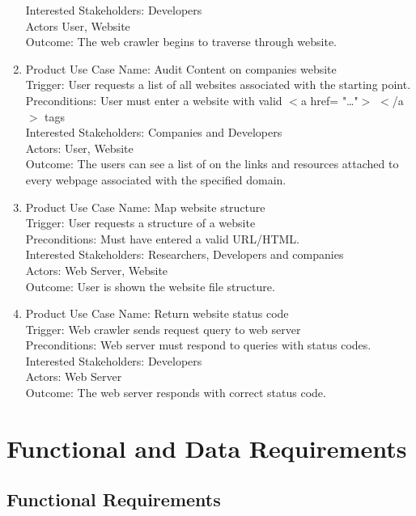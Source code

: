 \documentclass[titlepage]{article}
\begin{document}
\begin{enumerate}
Interested Stakeholders: Developers\\
Actors User, Website\\
Outcome: The web crawler begins to traverse through website.\\
  \item Product Use Case Name: Audit Content on companies website \\
Trigger: User requests a list of all websites associated with the starting point.\\
Preconditions: User must enter a website with valid $<$a href= "\ldots"$>$ $<$/a$>$ tags\\
Interested Stakeholders: Companies and Developers\\
Actors: User, Website\\
Outcome: The users can see a list of on the links and resources attached to every webpage associated with the specified domain.\\
  \item Product Use Case Name: Map website structure\\
Trigger: User requests a structure of a website\\
Preconditions: Must have entered a valid URL/HTML.\\
Interested Stakeholders: Researchers, Developers and companies\\
Actors: Web Server, Website\\
Outcome: User is shown the website file structure.\\
  \item Product Use Case Name: Return website status code\\
Trigger: Web crawler sends request query to web server\\
Preconditions: Web server must respond to queries with status codes. \\
Interested Stakeholders: Developers\\
Actors: Web Server\\
Outcome: The web server responds with correct status code.\\
\end{enumerate}

\section{Functional and Data Requirements}

\subsection*{Functional Requirements}
\end{document}
